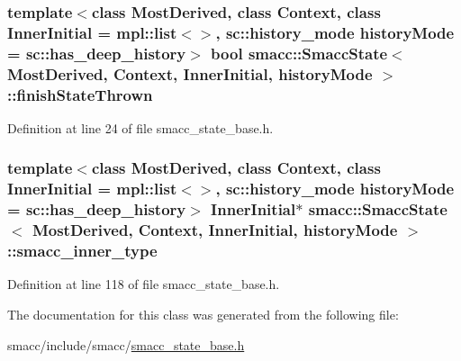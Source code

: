 \subsubsection[{\texorpdfstring{finish\+State\+Thrown}{finishStateThrown}}]{\setlength{\rightskip}{0pt plus 5cm}template$<$class Most\+Derived, class Context, class Inner\+Initial = mpl\+::list$<$$>$, sc\+::history\+\_\+mode history\+Mode = sc\+::has\+\_\+deep\+\_\+history$>$ {\bf bool} {\bf smacc\+::\+Smacc\+State}$<$ Most\+Derived, Context, Inner\+Initial, history\+Mode $>$\+::finish\+State\+Thrown}\hypertarget{classsmacc_1_1SmaccState_a6c40f733c35ddfb9ae2a2f8e9bab07d3}{}\label{classsmacc_1_1SmaccState_a6c40f733c35ddfb9ae2a2f8e9bab07d3}


Definition at line 24 of file smacc\+\_\+state\+\_\+base.\+h.

\subsubsection[{\texorpdfstring{smacc\+\_\+inner\+\_\+type}{smacc_inner_type}}]{\setlength{\rightskip}{0pt plus 5cm}template$<$class Most\+Derived, class Context, class Inner\+Initial = mpl\+::list$<$$>$, sc\+::history\+\_\+mode history\+Mode = sc\+::has\+\_\+deep\+\_\+history$>$ Inner\+Initial$\ast$ {\bf smacc\+::\+Smacc\+State}$<$ Most\+Derived, Context, Inner\+Initial, history\+Mode $>$\+::smacc\+\_\+inner\+\_\+type}\hypertarget{classsmacc_1_1SmaccState_a087d0f66729b98614feb8c59ea548af1}{}\label{classsmacc_1_1SmaccState_a087d0f66729b98614feb8c59ea548af1}


Definition at line 118 of file smacc\+\_\+state\+\_\+base.\+h.



The documentation for this class was generated from the following file\+:\begin{DoxyCompactItemize}
\item 
smacc/include/smacc/\hyperlink{smacc__state__base_8h}{smacc\+\_\+state\+\_\+base.\+h}\end{DoxyCompactItemize}
